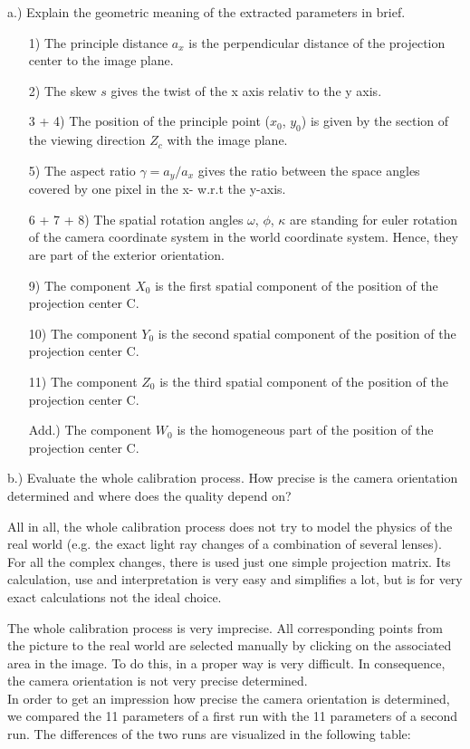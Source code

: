 \documentclass[a4paper,headings=small]{scrartcl}
\numberwithin{equation}{section} %
\numberwithin{figure}{section}   %
\begin{document}
a.) Explain the geometric meaning of the extracted parameters in brief.

\begin{enumerate}
\item[1)] The principle distance $a_x$ is the perpendicular distance of the projection center
to the image plane.
\item[2)] The skew $s$ gives the twist of the x axis relativ to the y axis.
\item[3 + 4)] The position of the principle point ($x_0$, $y_0$) is given by the section of the 
viewing direction $Z_c$ with the image plane.
\item[5)] The aspect ratio $\gamma=a_y/a_x$ gives the ratio between the space angles covered
by one pixel in the x- w.r.t the y-axis.
\item[6 + 7 + 8)] The spatial rotation angles $\omega$, $\phi$, $\kappa$ are standing for euler rotation of the camera coordinate system in the
world coordinate system. Hence, they are part of the exterior orientation.
\item[9)] The component $X_0$ is the first spatial component of the position of the projection center C.\\
\item[10)] The component $Y_0$ is the second spatial component of the position of the projection center C.\\
\item[11)] The component $Z_0$ is the third spatial component of the position of the projection center C.\\
\item[Add.)] The component $W_0$ is the homogeneous part of the position of the projection center C.\\
\end{enumerate} 

b.) Evaluate the whole calibration process. How precise is the camera
orientation determined and where does the quality depend on?

All in all, the whole calibration process does not try to model the physics of the real world
(e.g. the exact light ray changes of a combination of several lenses).
For all the complex changes, there is used just one simple projection matrix.
Its calculation, use and interpretation is very easy and simplifies a lot,
but is for very exact calculations not the ideal choice.

The whole calibration process is very imprecise.
All corresponding points from the picture to the real world are selected manually 
by clicking on the associated area in the image.
To do this, in a proper way is very difficult. In consequence, the camera orientation
is not very precise determined.\\
In order to get an impression how precise the camera orientation is determined,
we compared the 11 parameters of a first run with the 11 parameters of a second run.
The differences of the two runs are visualized in the following table:
\end{document}
